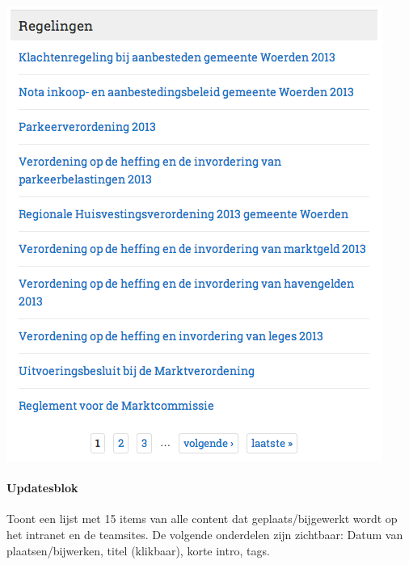 \begin{center}
	\includegraphics[scale=0.5]{img/blokken/regelingen.png}
\end{center}

\paragraph{Updatesblok}

Toont een lijst met 15 items van alle content dat geplaats/bijgewerkt wordt op het intranet en de teamsites. De volgende onderdelen zijn zichtbaar: Datum van plaatsen/bijwerken, titel (klikbaar), korte intro, tags.

